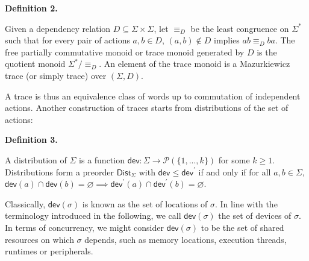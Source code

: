  
 
\par\medskip\noindent\textbf{Definition 2.}\par
 
 
Given a dependency relation $D\subseteq\Sigma\times\Sigma$, let $\equiv_{D}$ be the least congruence on $\Sigma^{*}$ such that for every pair of actions $a,b\in D$, $(a,b)\notin D$ implies $ab\equiv_{D}ba$. The free partially commutative monoid or trace monoid generated by $D$ is the quotient monoid $\Sigma^{*}/{\equiv_{D}}$. An element of the trace monoid is a Mazurkiewicz trace (or simply trace) over $(\Sigma,D)$.\par
 
 
 
 
A trace is thus an equivalence class of words up to commutation of independent actions. Another construction of traces starts from distributions of the set of actions:\par
 
 
 
\par\medskip\noindent\textbf{Definition 3.}\par
 
 
A distribution of $\Sigma$ is a function $\mathsf{dev}:\Sigma\to\mathscr{P}(\{1,...,k\})$ for some $k\geqslant 1$. Distributions form a preorder $\mathsf{Dist}_{\Sigma}$ with $\mathsf{dev}\leqslant\mathsf{dev}^{\prime}$ if and only if for all $a,b\in\Sigma$, $\mathsf{dev}(a)\cap\mathsf{dev}(b)=\varnothing\implies\mathsf{dev}^{\prime}(a)\cap\mathsf{dev}^{\prime}(b)=\varnothing.$\par
 
 
 
 
Classically, $\mathsf{dev}(\sigma)$ is known as the set of locations of $\sigma$. In line with the terminology introduced in the following, we call $\mathsf{dev}(\sigma)$ the set of devices of $\sigma$. In terms of concurrency, we might consider $\mathsf{dev}(\sigma)$ to be the set of shared resources on which $\sigma$ depends, such as memory locations, execution threads, runtimes or peripherals.\par
 
